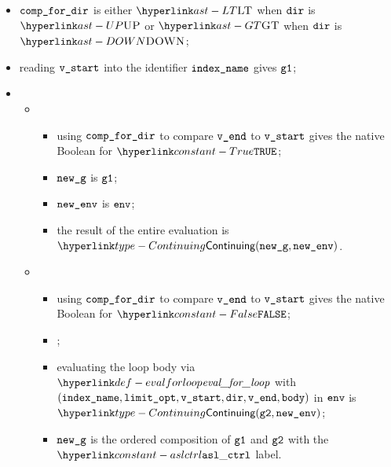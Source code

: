 \AllApply
\begin{itemize}
  \item $\texttt{comp\_for\_dir}$ is either $\LT$ when $\texttt{dir}$ is $\UP$ or $\GT$ when $\texttt{dir}$ is $\DOWN$;
  \item reading $\texttt{v\_start}$ into the identifier $\texttt{index\_name}$ gives $\texttt{g1}$;
  \item \OneApplies
    \begin{itemize}
    \item {}
    \begin{itemize}
      \item using $\texttt{comp\_for\_dir}$ to compare $\texttt{v\_end}$ to $\texttt{v\_start}$ gives the native \\
            Boolean for $\True$;
      \item $\texttt{new\_g}$ is $\texttt{g1}$;
      \item $\texttt{new\_env}$ is $\texttt{env}$;
      \item the result of the entire evaluation is $\Continuing(\newg, \newenv)$.
    \end{itemize}
    \item {}
    \begin{itemize}
      \item using $\texttt{comp\_for\_dir}$ to compare $\texttt{v\_end}$ to $\texttt{v\_start}$ gives the native \\
            Boolean for $\False$;
      \item \Proseticklooplimit{$\vlimitopt$}{$\vnextlimitopt$}\ProseOrError;
      \item evaluating the loop body via $\evalforloop$ with \\ $(\texttt{index\_name}, \texttt{limit\_opt}, \texttt{v\_start}, \texttt{dir}, \texttt{v\_end}, \texttt{body})$
      in $\texttt{env}$ is \\ $\Continuing(\vgtwo, \newenv)$\ProseOrAbnormalReturning;
      \item $\texttt{new\_g}$ is the ordered composition of $\texttt{g1}$ and $\texttt{g2}$ with the $\aslctrl$ label.
    \end{itemize}
  \end{itemize}
\end{itemize}

